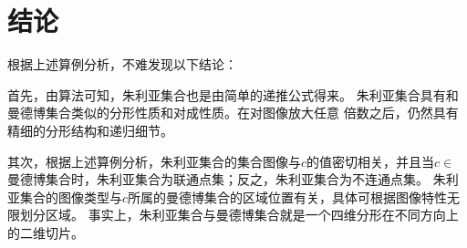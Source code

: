 \section{结论}
根据上述算例分析，不难发现以下结论：
\par 
首先，由算法可知，朱利亚集合也是由简单的递推公式得来。
朱利亚集合具有和曼德博集合类似的分形性质和对成性质。在对图像放大任意
倍数之后，仍然具有精细的分形结构和递归细节。
\par 
其次，根据上述算例分析，朱利亚集合的集合图像与$c$的值密切相关，并且当$c \in$
曼德博集合时，朱利亚集合为联通点集；反之，朱利亚集合为不连通点集。
朱利亚集合的图像类型与$c$所属的曼德博集合的区域位置有关，具体可根据图像特性无限划分区域。
事实上，朱利亚集合与曼德博集合就是一个四维分形在不同方向上的二维切片。